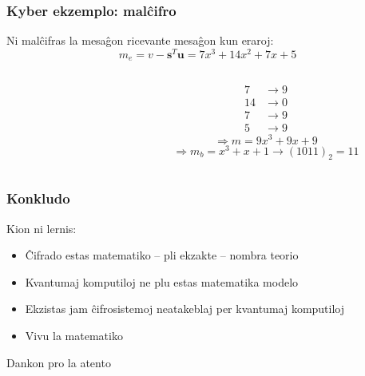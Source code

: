 \documentclass[utf8, aspectratio=169]{beamer}
\begin{document}
\begin{frame}
  \frametitle{Kyber ekzemplo: malĉifro}
  Ni malĉifras la mesaĝon ricevante mesaĝon kun eraroj:
  \[m_e = v - \mathbf{s}^T\mathbf{u} = 7x^3 + 14x^2 + 7x + 5\]

  \pause
  \begin{columns}
    \begin{column}{0.4\textwidth}
    \end{column}

    \begin{column}{0.6\textwidth}
      \[
        \begin{split}
          7 & \longrightarrow 9 \\
          14 & \longrightarrow 0 \\
          7 & \longrightarrow 9 \\
          5 & \longrightarrow 9
        \end{split}
      \]
      \pause
      \[\Longrightarrow m = 9x^3 + 9x + 9\]
      \pause
      \[\Longrightarrow m_b = x^3 + x + 1 \longrightarrow (1011)_2 = 11\]
    \end{column}
  \end{columns}
\end{frame}

\begin{frame}
  \frametitle{Konkludo}
  Kion ni lernis:
  \begin{itemize}
  \item Ĉifrado estas matematiko – pli ekzakte – nombra teorio
  \item Kvantumaj komputiloj ne plu estas matematika modelo
  \item Ekzistas jam ĉifrosistemoj neatakeblaj per kvantumaj komputiloj
  \item<2-> Vivu la matematiko
  \end{itemize}
\end{frame}

\begin{frame}
  \centering Dankon pro la atento
\end{frame}
\end{document}
